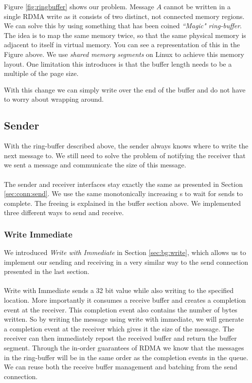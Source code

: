 Figure \ref{fig:ringbuffer} shows our problem. Message $A$ cannot be written in a single RDMA write as it consists of 
two distinct, not connected memory regions. We can solve this by using something that has been coined 
\emph{``Magic" ring-buffer}. The idea is to map the same memory twice, so that the same physical memory is adjacent to itself
in virtual memory. You can see a representation of this in the Figure above. We use \emph{shared memory segments} on 
Linux to achieve this memory layout. One limitation this introduces is that the buffer length needs to be a multiple of the
page size.

With this change we can simply write over the end of the buffer and do not have to worry about wrapping around.




\subsection{Sender} \label{sec:conn:write:sender}

With the ring-buffer described above, the sender always knows where to write the next message to. We still need to solve
the problem of notifying the receiver that we sent a message and communicate the size of this message.

\paragraph{}The sender and receiver interfaces stay exactly the same as presented in Section \ref{sec:conn:send}. We use the same 
monotonically increasing s to wait for sends to complete. The freeing is explained in the buffer section
above. We implemented three different ways to send and receive.


\subsubsection{Write Immediate}

We introduced \emph{Write with Immediate} in Section \ref{sec:bg:write}, which  allows us to implement our sending 
and receiving in a very similar way to the send connection presented in the last section.

\paragraph{} Write with Immediate sends a 32 bit value while also writing to the specified location. More importantly it 
consumes a receive buffer and creates a completion event at the receiver. This completion event also contains the number 
of bytes written. So by writing the message using write with immediate, we will generate a completion event at the receiver
which gives it the size of the message. The receiver can then immediately repost the received buffer and return the buffer
segment. Through the in-order guarantees of RDMA we know that the messages in the ring-buffer will be in the same
order as the completion events in the queue. We can reuse both the receive buffer management and batching from the send 
connection.


